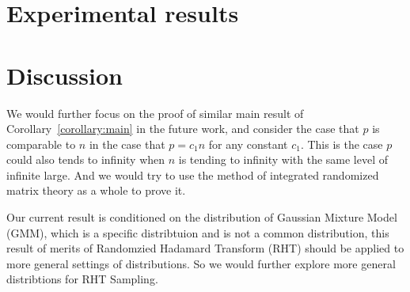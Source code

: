 \documentclass[11pt]{article}
\numberwithin{equation}{section}
\theoremstyle{plain}
\theoremstyle{definition}
\theoremstyle{remark}
\begin{document}
\section{Experimental results}

\section{Discussion}
We would further focus on the proof of similar main result of Corollary~\ref{corollary:main} in the future work, and consider the case that $p$ is comparable to $n$ in the case that $p = c_1 n$ for any constant $c_1$. This is the case $p$ could also tends to infinity when $n$ is tending to infinity with the same level of infinite large. And we would try to use the method of integrated randomized matrix theory as a whole to prove it.

Our current result is conditioned on the distribution of Gaussian Mixture Model (GMM), which is a specific distribtuion and is not a common distribution, this result of merits of Randomzied Hadamard Transform (RHT) should be applied to more general settings of distributions. So we would further explore more general distribtions for RHT Sampling. 
\printbibliography %
\end{document}
